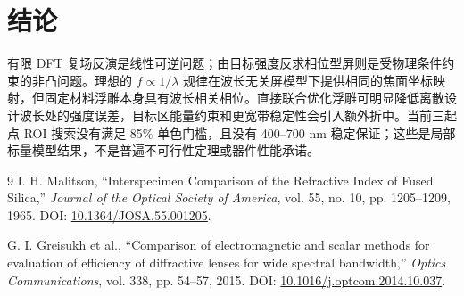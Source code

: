 \documentclass[UTF8,a4paper,11pt,fontset=fandol]{ctexart}
\begin{document}
\section{结论}

有限 DFT 复场反演是线性可逆问题；由目标强度反求相位型屏则是受物理条件约束的非凸问题。理想的 $f\propto1/\lambda$ 规律在波长无关屏模型下提供相同的焦面坐标映射，但固定材料浮雕本身具有波长相关相位。直接联合优化浮雕可明显降低离散设计波长处的强度误差，目标区能量约束和更宽带稳定性会引入额外折中。当前三起点 ROI 搜索没有满足 85\% 单色门槛，且没有 400--700 nm 稳定保证；这些是局部标量模型结果，不是普遍不可行性定理或器件性能承诺。

\begin{thebibliography}{9}
I. H. Malitson, “Interspecimen Comparison of the Refractive Index of Fused Silica,”
\textit{Journal of the Optical Society of America}, vol. 55, no. 10, pp. 1205--1209, 1965.
DOI: \href{https://doi.org/10.1364/JOSA.55.001205}{10.1364/JOSA.55.001205}.

G. I. Greisukh et al., “Comparison of electromagnetic and scalar methods for evaluation of efficiency of diffractive lenses for wide spectral bandwidth,”
\textit{Optics Communications}, vol. 338, pp. 54--57, 2015.
DOI: \href{https://doi.org/10.1016/j.optcom.2014.10.037}{10.1016/j.optcom.2014.10.037}.
\end{thebibliography}
\end{document}
